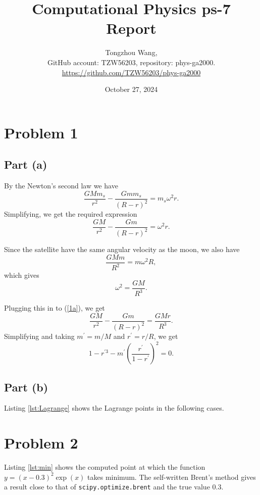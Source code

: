 \documentclass[11pt]{article}
\title{Computational Physics ps-7 Report}
\author{Tongzhou Wang, \\ GitHub account: TZW56203, repository: phys-ga2000. \\ \url{https://github.com/TZW56203/phys-ga2000}}
\date{October 27, 2024}
\begin{document}
\maketitle

\section{Problem 1}

\subsection{Part (a)}
By the Newton's second law we have
\begin{equation}
    \frac{GMm_s}{r^2} - \frac{Gmm_s}{(R-r)^2} = m_s \omega^2 r.
\end{equation}
Simplifying, we get the required expression
\begin{equation}\label{1a}
    \frac{GM}{r^2} - \frac{Gm}{(R-r)^2} = \omega^2 r.
\end{equation}

Since the satellite have the same angular velocity as the moon, we also have
\begin{equation}
    \frac{GMm}{R^2} = m \omega^2 R,
\end{equation}
which gives
\begin{equation}
    \omega^2 = \frac{GM}{R^3}.
\end{equation}

Plugging this in to (\ref{1a}), we get
\begin{equation}
    \frac{GM}{r^2} - \frac{Gm}{(R-r)^2} = \frac{GMr}{R^3}.
\end{equation}
Simplifying and taking $m^{\prime} = m/M$ and $r^{\prime} = r/R$, we get
\begin{equation}
    1 - r^{\prime 3} - m^{\prime} \left( \frac{r^{\prime}}{1 - r^{\prime}} \right) ^2 = 0.
\end{equation}

\subsection{Part (b)}
Listing \ref{lst:Lagrange} shows the Lagrange points in the following cases.


\section{Problem 2}
Listing \ref{lst:min} shows the computed point at which the function $y = (x-0.3)^2 \exp(x)$ takes minimum. The self-written Brent's method gives a result close to that of \texttt{scipy.optimize.brent} and the true value 0.3.

\end{document}
